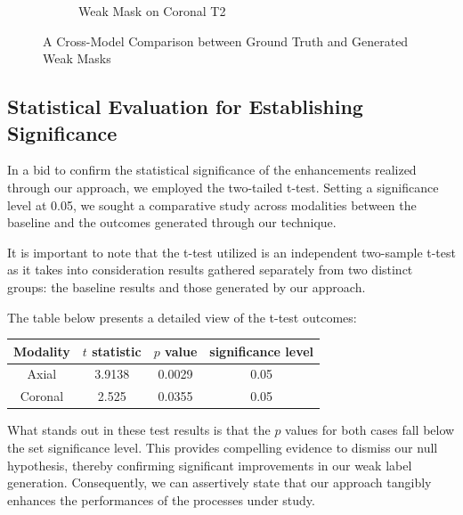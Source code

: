 \begin{figure}[htp]
\begin{subfigure}[b]{0.48\textwidth}
        \caption{Weak Mask on Coronal T2}
        \label{fig:mask-coronal}
    \end{subfigure}
       \caption{A Cross-Model Comparison between Ground Truth and Generated Weak Masks}
       \label{fig:comparison-mask-gt}
\end{figure}
\subsection{Statistical Evaluation for Establishing Significance}

In a bid to confirm the statistical significance of the enhancements realized through our approach, we employed the two-tailed t-test. Setting a significance level at 0.05, we sought a comparative study across modalities between the baseline and the outcomes generated through our technique.

It is important to note that the t-test utilized is an independent two-sample t-test as it takes into consideration results gathered separately from two distinct groups: the baseline results and those generated by our approach.

The table below presents a detailed view of the t-test outcomes:

\begin{table}[ht]
\centering
\begin{tabular}{c|c|c|c}
Modality & \(t\) statistic & \(p\) value & significance level \\
\hline
Axial & 3.9138 & 0.0029 & 0.05 \\
\hline
Coronal & 2.525 & 0.0355 & 0.05
\end{tabular}
\end{table}

What stands out in these test results is that the \(p\) values for both cases fall below the set significance level. This provides compelling evidence to dismiss our null hypothesis, thereby confirming significant improvements in our weak label generation. Consequently, we can assertively state that our approach tangibly enhances the performances of the processes under study.
